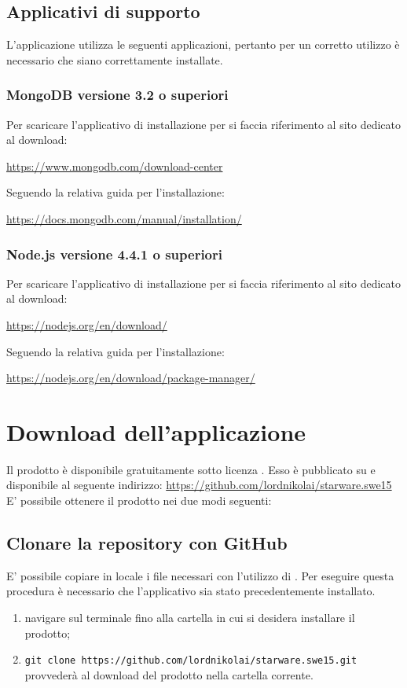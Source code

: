 \documentclass[12pt,a4paper]{article}
\begin{document}
	\subsection{Applicativi di supporto}
	L'applicazione \prj{} utilizza le seguenti applicazioni, pertanto per un corretto utilizzo è necessario che siano correttamente installate.
	\subsubsection{MongoDB versione 3.2 o superiori}
	Per scaricare l'applicativo di installazione per  si faccia riferimento al sito dedicato al download:
	\begin{center} \url{https://www.mongodb.com/download-center}
	\end{center}
	Seguendo la relativa guida per l'installazione:
		\begin{center} \url{https://docs.mongodb.com/manual/installation/}
		\end{center}
	
	\subsubsection{Node.js versione 4.4.1 o superiori}
		Per scaricare l'applicativo di installazione per  si faccia riferimento al sito dedicato al download:
		\begin{center} \url{https://nodejs.org/en/download/} 
		\end{center}
		Seguendo la relativa guida per l'installazione:
		\begin{center} \url{https://nodejs.org/en/download/package-manager/}
		\end{center}
	
	\newpage
	\section{Download dell'applicazione}\label{download}
	Il prodotto è disponibile gratuitamente sotto  licenza \licenza. Esso è pubblicato su  e disponibile al seguente indirizzo: \url{https://github.com/lordnikolai/starware.swe15}
	E' possibile ottenere il prodotto nei due modi seguenti:
	\subsection{Clonare la repository con GitHub}
	E' possibile copiare in locale i file necessari con l'utilizzo di . 
	Per eseguire questa procedura è necessario che l'applicativo  sia stato precedentemente installato.
	\begin{enumerate}
		\item navigare sul terminale fino alla cartella in cui si desidera installare il prodotto;
		\item \texttt{git clone https://github.com/lordnikolai/starware.swe15.git} provvederà al download del prodotto nella cartella corrente. 
	\end{enumerate}
	
\end{document}
